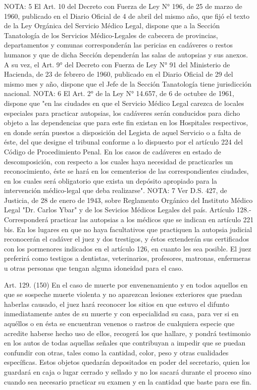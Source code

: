 NOTA:  5
    El Art. 10 del Decreto con Fuerza de Ley N° 196, de 25 de marzo de 1960, publicado en el Diario Oficial de 4 de abril del mismo año, que fijó el texto de la Ley Orgánica del Servicio Médico Legal, dispone que a la Sección Tanatología de los Servicios Médico-Legales de cabecera de provincias, departamentos y comunas corresponderán las pericias en cadáveres o restos humanos y que de dicha Sección dependerán las salas de autopsias y sus anexos.
    A su vez, el Art. 9° del Decreto con Fuerza de Ley N° 91 del Ministerio de Hacienda, de 23 de febrero de 1960, publicado en el Diario Oficial de 29 del mismo mes y año, dispone que el Jefe de la Sección Tanatología tiene jurisdicción nacional.
NOTA:  6
    El Art. 2° de la Ley N° 14.657, de 6 de octubre de 1961, dispone que "en las ciudades en que el Servicio Médico Legal carezca de locales especiales para practicar autopsias, los cadáveres serán conducidos para dicho objeto a las dependencias que para este fin existan en los Hospitales respectivos, en donde serán puestos a disposición del Legista de aquel Servicio o a falta de éste, del que designe el tribunal conforme a lo dispuesto por el artículo 224 del Código de Procedimiento Penal.
    En los casos de cadáveres en estado de descomposición, con respecto a los cuales haya necesidad de practicarles un reconocimiento, éste se hará en los cementerios de las correspondientes ciudades, en los cuales será obligatorio que exista un depósito apropiado para la intervención médico-legal que deba realizarse".
NOTA:  7
    Ver D.S. 427, de Justicia, de 28 de enero de 1943, sobre Reglamento Orgánico del Instituto Médico Legal "Dr. Carlos Ybar" y de los Sevicios Médicos Legales del país.
    Artículo 128.-  Corresponderá practicar las autopsias a los médicos que se indican en artículo 221 bis.
      En los lugares en que no haya facultativos que practiquen la autopsia judicial reconocerán el cadáver el juez y dos trestigos, y éstos extenderán sus certificados con los pormenores indicados en el artículo 126, en cuanto les sea posible.  El juez preferirá como testigos a dentistas, veterinarios, profesores, matronas, enfermeras u otras personas que tengan alguna idoneidad para el caso.

    Art. 129. (150) En el caso de muerte por envenenamiento y en todos aquellos en que se sospeche muerte violenta y no aparezcan lesiones exteriores que puedan haberlas causado, el juez hará reconocer los sitios en que estuvo el difunto inmediatamente antes de su muerte y con especialidad su casa, para ver si en aquéllos o en ésta se encuentran venenos o rastros de cualquiera especie que acredite haberse hecho uso de ellos, recogerá los que hallare, y pondrá testimonio en los autos de todas aquellas señales que contribuyan a impedir que se puedan confundir con otras, tales como la cantidad, color, peso y otras cualidades específicas.
    Estos objetos quedarán depositados en poder del secretario, quien los guardará en caja o lugar cerrado y sellado y no los sacará durante el proceso sino cuando sea necesario practicar su examen y en la cantidad que baste para ese fin.

